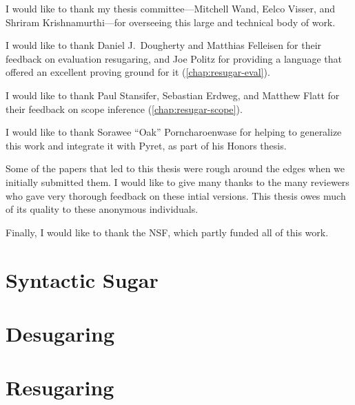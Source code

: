 \documentclass[
  10pt,
  paper=letter,
  footinclude=true,
  headinclude=true,
  american
]{scrbook}
\renewcommand{\<}{\le}
\begin{document}
I would like to thank my thesis committee---Mitchell Wand, Eelco
Visser, and Shriram Krishnamurthi---for overseeing this large and
technical body of work.

I would like to thank Daniel J.~Dougherty and Matthias Felleisen for
their feedback on evaluation resugaring, and Joe Politz for providing
a language that offered an excellent proving ground for it
(\cref{chap:resugar-eval}).

I would like to thank Paul Stansifer, Sebastian Erdweg, and Matthew
Flatt for their feedback on scope inference
(\cref{chap:resugar-scope}).

I would like to thank Sorawee ``Oak'' Porncharoenwase for helping to
generalize this work and integrate it with Pyret, as part of his
Honors thesis.%

Some of the papers that led to this thesis were rough around the edges
when we initially submitted them. I would like to give many thanks to
the many reviewers who gave very thorough feedback on these
intial versions. This thesis owes much of its quality to these
anonymous individuals.

Finally, I would like to thank the NSF, which partly funded all of this work.

\part{Syntactic Sugar}

\part{Desugaring}


%
\part{Resugaring}
%
%



\end{document}
